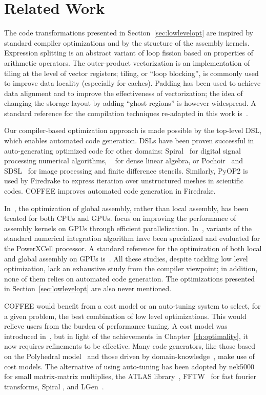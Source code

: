 \section{Related Work}
\label{sec:coffee-related-work}
The code transformations presented in Section~\ref{sec:lowlevelopt} are inspired by standard compiler optimizations and by the structure of the assembly kernels. Expression splitting is an abstract variant of loop fission based on properties of arithmetic operators. The outer-product vectorization is an implementation of tiling at the level of vector registers; tiling, or ``loop blocking'', is commonly used to improve data locality (especially for caches). Padding has been used to achieve data alignment and to improve the effectiveness of vectorization; the idea of changing the storage layout by adding ``ghost regions'' is however widespread. A standard reference for the compilation techniques re-adapted in this work is~\cite{dragonbook}.

Our compiler-based optimization approach is made possible by the top-level DSL, which enables automated code generation. DSLs have been proven successful in auto-generating optimized code for other domains: Spiral~\citep{Pueschel:05} for digital signal processing numerical algorithms, ~\citep{Spampinato:14} for dense linear algebra, or Pochoir~\citep{pochoir} and SDSL~\citep{stencil-compiler} for image processing and finite difference stencils. Similarly, PyOP2 is used by Firedrake to express iteration over unstructured meshes in scientific codes. COFFEE improves automated code generation in Firedrake.

In~\cite{Markall20101815}, the optimization of global assembly, rather than local assembly, has been treated for both CPUs and GPUs. \cite{petsc-integration-gpu} focus on improving the performance of assembly kernels on GPUs through efficient parallelization. In~\cite{assembly-opencl}, variants of the standard numerical integration algorithm have been specialized and evaluated for the PowerXCell processor. A standard reference for the optimization of both local and global assembly on GPUs is~\citep{fem-gpu-study}. All these studies, despite tackling low level optimization, lack an exhaustive study from the compiler viewpoint; in addition, none of them relies on automated code generation. The optimizations presented in Section~\ref{sec:lowlevelopt} are also never mentioned. 

COFFEE would benefit from a cost model or an auto-tuning system to select, for a given problem, the best combination of low level optimizations. This would relieve users from the burden of performance tuning. A cost model was introduced in~\cite{Luporini-coffee}, but in light of the achievements in Chapter~\ref{ch:optimality}, it now requires refinements to be effective. Many code generators, like those based on the Polyhedral model~\citep{pluto} and those driven by domain-knowledge~\citep{modeldriven}, make use of cost models. The alternative of using auto-tuning has been adopted by nek5000~\citep{nek5000} for small matrix-matrix multiplies, the ATLAS library~\citep{ATLAS}, FFTW~\citep{FFTW} for fast fourier transforms, Spiral \citep{Pueschel:05}, and LGen~\citep{Spampinato:14}. 


